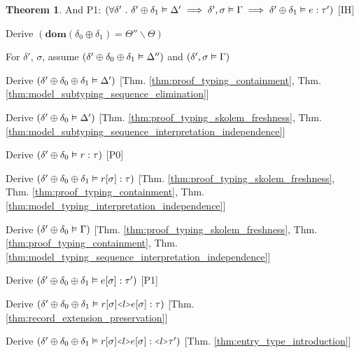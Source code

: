 \documentclass[acmsmall]{acmart}
\theoremstyle{definition}
\newtheorem{theorem}{Theorem}[section]
\begin{document}
\begin{theorem}
  \item \I \N And P1: $(
    \forall \delta' \ .\  
    \delta' \oplus \delta_1 \vDash \Delta'
    \implies 
    \delta', \sigma \vDash \Gamma
    \implies 
    \delta' \oplus \delta_1 \vDash e : \tau'
  )$ [IH]

  \item \I \N Derive $(
    \textbf{dom}(\delta_0 \oplus \delta_1) = \Theta'' \backslash \Theta
  )$ 

  \item \I \N For $\delta'$, $\sigma$,
    assume $(\delta' \oplus \delta_0 \oplus \delta_1 \vDash \Delta'')$
    and $(\delta', \sigma \vDash \Gamma)$

  \item \I\I \N Derive $(
    \delta' \oplus \delta_0 \oplus \delta_1 \vDash \Delta'
  )$ [Thm. \ref{thm:proof_typing_containment}, Thm. \ref{thm:model_subtyping_sequence_elimination}]
  \item \I\I \N Derive $(
    \delta' \oplus \delta_0 \vDash \Delta'
  )$ [Thm. \ref{thm:proof_typing_skolem_freshness}, Thm. \ref{thm:model_subtyping_sequence_interpretation_independence}]
  \item \I\I \N Derive $(
    \delta' \oplus \delta_0 \vDash r : \tau
  )$ [P0]
  \item \I\I \N Derive $(
    \delta' \oplus \delta_0 \oplus \delta_1 \vDash r[\sigma] : \tau
  )$ [Thm. \ref{thm:proof_typing_skolem_freshness}, 
      Thm. \ref{thm:proof_typing_containment},
      Thm. \ref{thm:model_typing_interpretation_independence}]

  \item \I\I \N Derive $(
    \delta' \oplus \delta_0 \vDash \Gamma
  )$ [Thm. \ref{thm:proof_typing_skolem_freshness},
      Thm. \ref{thm:proof_typing_containment},
      Thm. \ref{thm:model_typing_sequence_interpretation_independence}]

  \item \I\I \N Derive $(
    \delta' \oplus \delta_0 \oplus \delta_1 \vDash e[\sigma] : \tau'
  )$ [P1]

  \item \I\I \N Derive $(
    \delta' \oplus \delta_0 \oplus \delta_1 \satisfies r[\sigma]\J{<}l\J{>}e[\sigma] \hastype \tau
  )$ [Thm. \ref{thm:record_extension_preservation}]

  \item \I\I \N Derive $(
    \delta' \oplus \delta_0 \oplus \delta_1 \satisfies r[\sigma]\J{<}l\J{>}e[\sigma] \hastype \J{<}l\J{>}\tau'
  )$ [Thm. \ref{thm:entry_type_introduction}]


\end{theorem}
\end{document}
